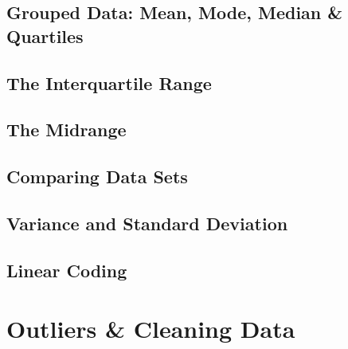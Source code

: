 \documentclass[../alevelmaths.tex]{subfiles}
\begin{document}
\subsection*{Grouped Data: Mean, Mode, Median \& Quartiles}
\subsection*{The Interquartile Range}
\subsection*{The Midrange}
\subsection*{Comparing Data Sets}
\subsection*{Variance and Standard Deviation}
\subsection*{Linear Coding}
\section{Outliers \& Cleaning Data}
\end{document}
